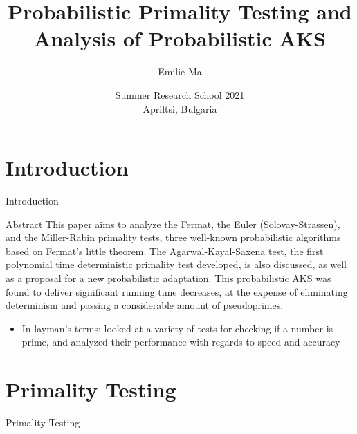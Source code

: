 \documentclass[pdf,aspectratio=169]{beamer}
\title[Primality Testing]{Probabilistic Primality Testing and Analysis of Probabilistic AKS}
\author[Emilie Ma]{Emilie Ma}
\date[SRS'21]{Summer Research School 2021\\Apriltsi, Bulgaria}
\begin{document}
\begin{frame}
    \thispagestyle{empty}
    \titlepage
\end{frame}
\addtocounter{framenumber}{-1}

\section{Introduction}
\begin{frame}{Introduction}
    \fontsize{8}{9}\selectfont
    \begin{block}{Abstract}
        This paper aims to analyze the Fermat, the Euler (Solovay-Strassen), and the Miller-Rabin primality tests, three well-known probabilistic algorithms based on Fermat's little theorem. The Agarwal-Kayal-Saxena test, the first polynomial time deterministic primality test developed, is also discussed, as well as a proposal for a new probabilistic adaptation. This probabilistic AKS was found to deliver significant running time decreases, at the expense of eliminating determinism and passing a considerable amount of pseudoprimes.
    \end{block}
    \pause
    \normalfont
    \begin{itemize}
        \item{In layman's terms: looked at a variety of tests for checking if a number is prime, and analyzed their performance with regards to speed and accuracy}
    \end{itemize}
\end{frame}

\section{Primality Testing}
\begin{frame}{Primality Testing}
    \begin{outline}
        \pause
    \end{outline}
\end{frame}
\end{document}
